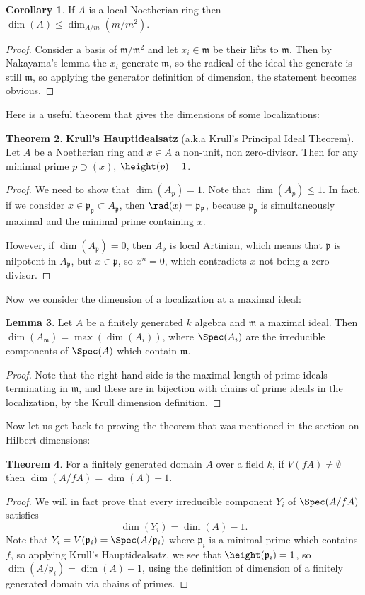 \documentclass[12 pt]{article}
\theoremstyle{definition}
\newtheorem{thm}{Theorem}[section]
\newtheorem{cor}[thm]{Corollary}
\newtheorem{lemma}[thm]{Lemma}
\renewcommand{\(}{\left(}
\renewcommand{\)}{\right)}
\newcommand\fp{{\mathfrak p}}
\newcommand\fm{{\mathfrak m}}
\begin{document}
\begin{cor} If $A$ is a local Noetherian ring then $\dim(A) \leq \dim_{A/m}(m/m^2)$.
\label{loc ring dim ineq}
\end{cor}
\begin{proof} Consider a basis of $\fm/\fm^2$ and let $x_i \in \fm$ be their lifts to $\fm$. Then by Nakayama's lemma the $x_i$ generate $\fm$, so the radical of the ideal the generate is still $\fm$, so applying the generator definition of dimension, the statement becomes obvious.
\end{proof}


Here is a useful theorem that gives the dimensions of some localizations:
\begin{thm} \textbf{Krull's Hauptidealsatz} (a.k.a Krull's Principal Ideal Theorem). Let $A$ be a Noetherian ring and $x \in A$ a non-unit, non zero-divisor. Then for any minimal prime $p \supset (x)$, $\height(p) =1$.
\end{thm}
\begin{proof} We need to show that $\dim(A_p)=1$. Note that $\dim(A_p) \leq 1$. In fact, if we consider $x \in \fp_\fp \subset A_\fp$, then $\rad(x)=\fp_\fp$, because $\fp_\fp$ is simultaneously maximal and the minimal prime containing $x$.

However, if $\dim(A_\fp)=0$, then $A_\fp$ is local Artinian, which means that $\fp$ is nilpotent in $A_\fp$, but $x \in \fp$, so $x^n=0$, which contradicts $x$ not being a zero-divisor.
\end{proof}


Now we consider the dimension of a localization at a maximal ideal:
\begin{lemma} Let $A$ be a finitely generated $k$ algebra and $\fm$ a maximal ideal. Then $\dim(A_\fm)=\max(\dim(A_i))$, where $\Spec(A_i)$ are the irreducible components of $\Spec(A)$ which contain $\fm$.
\label{dim of localize at max ideal}
\end{lemma}
\begin{proof} Note that the right hand side is the maximal length of prime ideals terminating in $\fm$, and these are in bijection with chains of prime ideals in the localization, by the Krull dimension definition.
\end{proof}


Now let us get back to proving the theorem that was mentioned in the section on Hilbert dimensions:

\begin{thm} For a finitely generated domain $A$ over a field $k$, if $V(fA) \neq \emptyset$ then $\dim(A/fA)=\dim(A)-1$.
\label{dim drop by 1}
\end{thm}
\begin{proof} We will in fact prove that every irreducible component $Y_i$ of $\Spec(A/fA)$ satisfies \[\dim(Y_i)=\dim(A)-1.\]
Note that $Y_i=V(\fp_i)=\Spec(A/\fp_i)$ where $\fp_i$ is a minimal prime which contains $f$, so applying Krull's Hauptidealsatz, we see that $\height(\fp_i)=1$, so $\dim(A/\fp_i)=\dim(A)-1$, using the definition of dimension of a finitely generated domain via chains of primes.
\end{proof}
\end{document}

